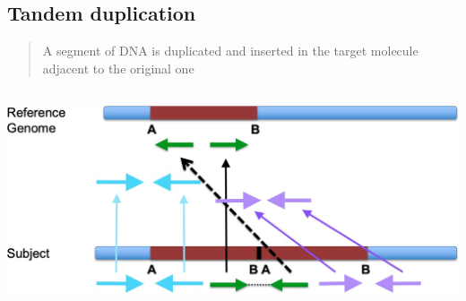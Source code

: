 \hypertarget{tandem-duplication}{%
\subsection{Tandem duplication}\label{tandem-duplication}}

\begin{quote}
A segment of DNA is duplicated and inserted in the target molecule
adjacent to the original one
\end{quote}

\includegraphics[width=6.1113in,height=2.55073in]{image23.jpeg}

